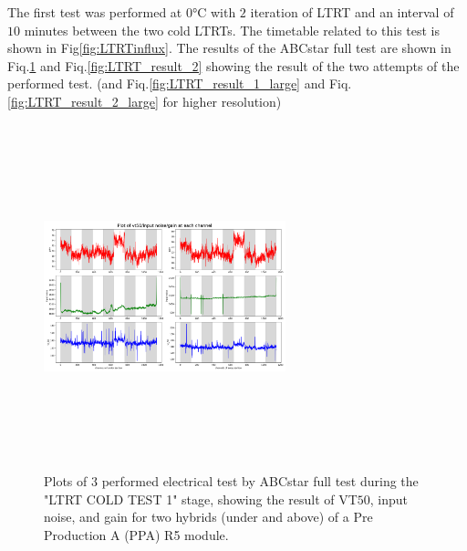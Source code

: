 The first test was performed at $0 \si{\celsius}$ with $2$ iteration of LTRT and an interval of $10$ minutes between the two cold LTRTs. The timetable related to this test is shown in Fig\ref{fig:LTRTinflux}. The results of the ABCstar full test are shown in Fiq.\ref{fig:LTRT_result_1} and Fiq.\ref{fig:LTRT_result_2} showing the result of the two attempts of the performed test. (and Fiq.\ref{fig:LTRT_result_1_large} and Fiq.\ref{fig:LTRT_result_2_large} for higher resolution)

\begin{figure}[h]
    \centering
    \includegraphics[width=7cm,height=10cm,keepaspectratio]{Figures/results/LTRT_1_plot.png}
    \caption{Plots of $3$ performed electrical test by ABCstar full test during the "LTRT COLD TEST 1" stage, showing the result of VT$50$, input noise, and gain for two hybrids (under and above) of a Pre Production A (PPA) R5 module.}
    \label{fig:LTRT_result_1}
\end{figure}

